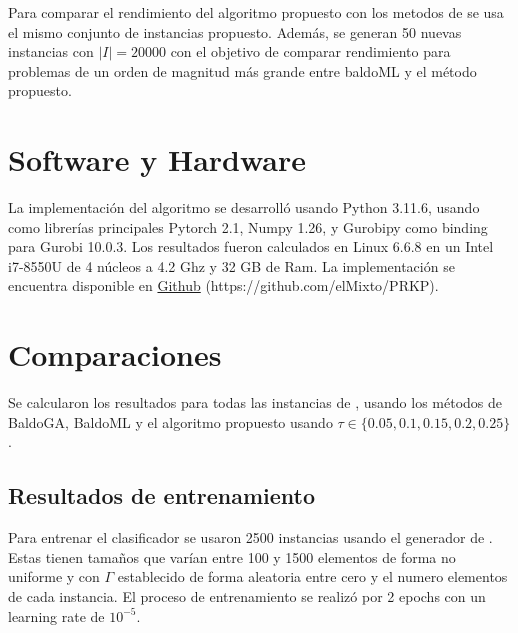 \documentclass[spanish, a4paper, 12pt, openany,final]{book}
\begin{document}
Para comparar el rendimiento del algoritmo propuesto con los metodos de \cite{baldo_polynomial_2023} se usa el mismo conjunto de instancias propuesto. Además, se generan 50 nuevas instancias con $|I| = 20000$ con el objetivo de comparar rendimiento para problemas de un orden de magnitud más grande entre baldoML y el método propuesto.

\section{Software y Hardware}

La implementación del algoritmo se desarrolló usando Python 3.11.6, usando como librerías principales Pytorch 2.1, Numpy 1.26, y Gurobipy como binding para Gurobi 10.0.3. Los resultados fueron calculados en Linux 6.6.8 en un Intel i7-8550U de 4 núcleos a 4.2 Ghz y 32 GB de Ram. La implementación se encuentra disponible en \href{https://github.com/elMixto/PRKP.git}{Github} (https://github.com/elMixto/PRKP).

\section{Comparaciones}


Se calcularon los resultados para todas las instancias de \cite{baldo_polynomial_2023}, usando los métodos de BaldoGA, BaldoML y el algoritmo propuesto usando $\tau \in \{0.05,0.1,0.15,0.2,0.25 \}$.


\subsection*{Resultados de entrenamiento}

Para entrenar el clasificador se usaron 2500 instancias usando el generador de \cite{baldo_polynomial_2023}. Estas tienen tamaños que varían entre 100 y 1500 elementos de forma no uniforme y con $\Gamma$ establecido de forma aleatoria entre cero y el numero elementos de cada instancia. El proceso de entrenamiento se realizó por 2 epochs con un learning rate de $10^{-5}$.
\end{document}
